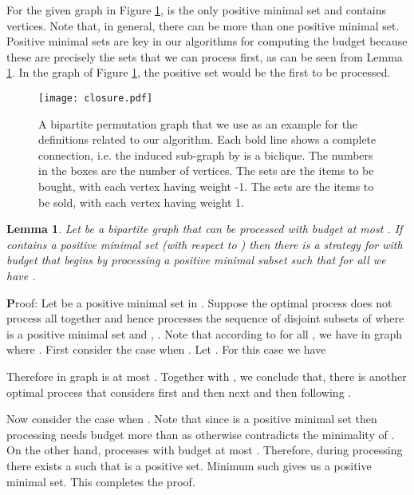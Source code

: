\documentclass[letterpaper,11pt,abstracton]{scrartcl}
\newcommand{\qed}{\hfill}
\newcommand{\pf}{{\textbf Proof: }}
\newtheorem{lemma}[theorem]{Lemma}
\begin{document}
For the given graph in Figure \ref{fig:2},  is the only positive minimal set and  contains  vertices. Note that, in general, there can be more than one positive minimal set.
Positive minimal sets are key in our algorithms for computing the budget
because these are precisely the sets that we can process
first, as can be seen from Lemma \ref{lm:minpos}.  In the graph of Figure \ref{fig:2}, the positive set 
would be the first to be processed.

\begin{figure}[htbp]
\begin{center}
\texttt{[image: closure.pdf]}
\caption{ A bipartite permutation graph that we use as an example for
    the definitions related to our algorithm.  Each bold line shows a
    complete connection, i.e. the induced sub-graph by  is a biclique. The numbers in
    the boxes are the number of vertices.  The sets 
    are the items  to be bought, with each vertex having weight
    -1.  The sets  are the items  to be sold,
    with each vertex having weight 1. }
\label{fig:2}
\end{center}
\end{figure}




\begin{lemma} \label{lm:minpos}
  Let  be a bipartite graph that can be processed with budget at most .
If  contains a positive minimal set (with respect to ) then there is a strategy for  with budget  
  that begins by processing a positive minimal
  subset  such that for all  we have .
\end{lemma}
\pf Let  be a positive minimal set in . Suppose the optimal process  does not process  all together and hence processes the sequence
 of disjoint subsets of  where
  is a positive minimal set and , . Note that according to 
for all ,  we have  in graph  
where .
First consider the case when . 
Let . 
For this case we have

Therefore  in graph  is at most .
Together with , we conclude that, there is another optimal process that considers  
first and then  next and then following . 

Now consider the case when . 
Note that since  is a positive minimal set then processing  
needs budget more than  as otherwise  contradicts the minimality of . On the other hand,  processes  
with budget at most . Therefore, during processing  there exists a  such 
that  is a positive set. Minimum such  gives us a positive minimal set.
This completes the proof.
\qed 
\end{document}
